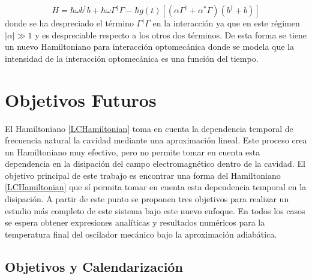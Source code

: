 \documentclass[10pt,a4paper]{report}
\begin{document}
\begin{equation}
H = \hbar \omega b^\dagger b + \hbar\omega \Gamma^\dagger \Gamma -\hbar g(t)[( \alpha \Gamma^{\dagger} + \alpha^* \Gamma)(b^{\dagger}+b)]
\end{equation} donde se ha despreciado el término $\Gamma^{\dagger}\Gamma$ en la interacción ya que en este régimen $|\alpha| \gg 1$ y es despreciable respecto a los otros dos términos. De esta forma se tiene un nuevo Hamiltoniano para interacción optomecánica donde se modela que la intensidad de la interacción optomecánica es una función del tiempo.

\chapter{Objetivos Futuros}

El Hamiltoniano  \eqref{LCHamiltonian} toma en cuenta la dependencia temporal de frecuencia natural la cavidad mediante una aproximación lineal. Este proceso crea un Hamiltoniano muy efectivo, pero no permite tomar en cuenta esta dependencia en la disipación del campo electromagnético dentro de la cavidad. El objetivo principal de este trabajo es encontrar una forma del Hamiltoniano \eqref{LCHamiltonian} que sí permita tomar en cuenta esta dependencia temporal en la disipación. A partir de este punto se proponen tres
objetivos para realizar un estudio más completo de este sistema bajo
este nuevo enfoque. En todos los casos
se espera obtener expresiones analíticas y resultados numéricos para
la temperatura final del oscilador mecánico bajo la aproximación
adiabática.

\section{Objetivos y Calendarización}
\end{document}
